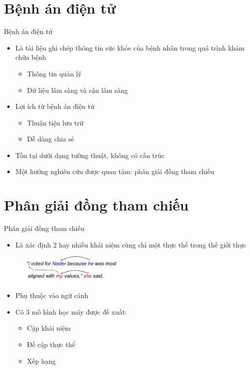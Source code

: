 \section{Bệnh án điện tử}
\begin{frame}{Bệnh án điện tử}
\putlogo
\begin{itemize}
	\item Là tài liệu ghi chép thông tin sức khỏe của bệnh nhân trong quá trình khám chữa bệnh
	\begin{itemize}
		\item Thông tin quản lý
		\item Dữ liệu lâm sàng và cận lâm sàng
	\end{itemize}
	\item Lợi ích từ bệnh án điện tử
	\begin{itemize}
		\item Thuận tiện lưu trữ
		\item Dễ dàng chia sẻ
	\end{itemize}
	\item Tồn tại dưới dạng tường thuật, không có cấu trúc
	\item Một hướng nghiên cứu được quan tâm: {\color{red} phân giải đồng tham chiếu}
\end{itemize}
\end{frame}

\section{Phân giải đồng tham chiếu}
\begin{frame}{Phân giải đồng tham chiếu}
\putlogo
\begin{itemize}
	\item Là xác định 2 hay nhiều khái niệm cùng chỉ một thực thể trong thế giới thực
\end{itemize}
\begin{figure}[ht!]
\centering
\includegraphics[width=0.5\textwidth]{./img/corefexample.png}
\end{figure}
\begin{itemize}
	\item Phụ thuộc vào ngữ cảnh
	\item Có 3 mô hình học máy được đề xuất:
	\begin{itemize}
		\item Cặp khái niệm
		\item Đề cập thực thể
		\item Xếp hạng
	\end{itemize}
\end{itemize}
\end{frame}